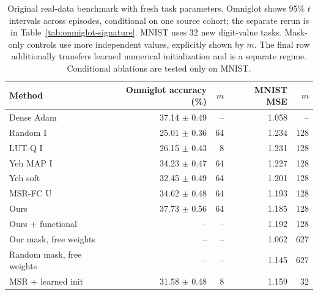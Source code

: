 \begin{table}[htbp]
\centering\small
\begin{tabular}{lrrrr}
\toprule
Method & Omniglot accuracy (\%) & $m$ & MNIST MSE & $m$\\
\midrule
Dense Adam & 37.14 $\pm$ 0.49 & -- & 1.058 & --\\
Random I & 25.01 $\pm$ 0.36 & 64 & 1.234 & 128\\
LUT-Q I & 26.15 $\pm$ 0.43 & 8 & 1.231 & 128\\
Yeh MAP I & 34.23 $\pm$ 0.47 & 64 & 1.227 & 128\\
Yeh soft & 32.45 $\pm$ 0.49 & 64 & 1.201 & 128\\
MSR-FC U & 34.62 $\pm$ 0.48 & 64 & 1.193 & 128\\
Ours & 37.73 $\pm$ 0.56 & 64 & 1.185 & 128\\
Ours + functional & -- & -- & 1.192 & 128\\
\midrule
Our mask, free weights & -- & -- & 1.062 & 627\\
Random mask, free weights & -- & -- & 1.145 & 627\\
\midrule
MSR + learned init & 31.58 $\pm$ 0.48 & 8 & 1.159 & 32\\
\bottomrule\end{tabular}
\caption{Original real-data benchmark with fresh task parameters. Omniglot shows 95\% $t$ intervals across episodes, conditional on one source cohort; the separate rerun is in Table~\ref{tab:omniglot-signature}. MNIST uses 32 new digit-value tasks. Mask-only controls use more independent values, explicitly shown by $m$. The final row additionally transfers learned numerical initialization and is a separate regime. Conditional ablations are tested only on MNIST.}
\label{tab:benchmark-real}
\end{table}
